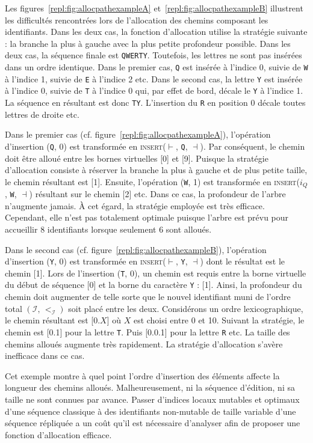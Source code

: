 Les figures~\ref{repl:fig:allocpathexampleA} et~\ref{repl:fig:allocpathexampleB}
illustrent les difficultés rencontrées lors de l'allocation des chemins
composant les identifiants. Dans les deux cas, la fonction d'allocation utilise
la stratégie suivante : la branche la plus à gauche avec la plus petite
profondeur possible. Dans les deux cas, la séquence finale est
\texttt{QWERTY}. Toutefois, les lettres ne sont pas insérées dans un ordre
identique. Dans le premier cas, \texttt{Q} est insérée à l'indice 0, suivie de
\texttt{W} à l'indice 1, suivie de \texttt{E} à l'indice 2 etc.  Dans le second
cas, la lettre \texttt{Y} est insérée à l'indice 0, suivie de \texttt{T} à
l'indice 0 qui, par effet de bord, décale le \texttt{Y} à l'indice 1. La
séquence en résultant est donc \texttt{TY}. L'insertion du \texttt{R} en
position 0 décale toutes lettres de droite etc.

Dans le premier cas (cf. figure~\ref{repl:fig:allocpathexampleA}), l'opération
d'insertion (\texttt{Q}, 0) est transformée en \textsc{insert}($\vdash$,
\texttt{Q}, $\dashv$). Par conséquent, le chemin doit être alloué entre les
bornes virtuelles [0] et [9]. Puisque la stratégie d'allocation consiste à
réserver la branche la plus à gauche et de plus petite taille, le chemin
résultant est [1]. Ensuite, l'opération (\texttt{W}, 1) est transformée en
\textsc{insert}($i_Q$, \texttt{W}, $\dashv$) résultant sur le chemin [2] etc.
Dans ce cas, la profondeur de l'arbre n'augmente jamais. À cet égard, la
stratégie employée est très efficace. Cependant, elle n'est pas totalement
optimale puisque l'arbre est prévu pour accueillir 8 identifiants lorsque
seulement 6 sont alloués.

Dans le second cas (cf. figure~\ref{repl:fig:allocpathexampleB}), l'opération
d'insertion (\texttt{Y}, 0) est transformée en \textsc{insert}($\vdash$,
\texttt{Y}, $\dashv$) dont le résultat est le chemin [1]. Lors de l'insertion
(\texttt{T}, 0), un chemin est requis entre la borne virtuelle du début de
séquence [0] et la borne du caractère \texttt{Y} : [1]. Ainsi, la profondeur du
chemin doit augmenter de telle sorte que le nouvel identifiant muni de l'ordre
total $(\mathcal{I},\,<_\mathcal{I})$ soit placé entre les deux. Considérons un
ordre lexicographique, le chemin résultant est [0.$X$] où $X$ est choisi entre 0
et 10. Suivant la stratégie, le chemin est [0.1] pour la lettre \texttt{T}. Puis
[0.0.1] pour la lettre \texttt{R} etc. La taille des chemins alloués augmente
très rapidement.  La stratégie d'allocation s'avère inefficace dans ce cas.

Cet exemple montre à quel point l'ordre d'insertion des éléments affecte la
longueur des chemins alloués. Malheureusement, ni la séquence d'édition, ni sa
taille ne sont connues par avance.  Passer d'indices locaux mutables et optimaux
d'une séquence classique à des identifiants non-mutable de taille variable d'une
séquence répliquée a un coût qu'il est nécessaire d'analyser afin de proposer
une fonction d'allocation efficace.


